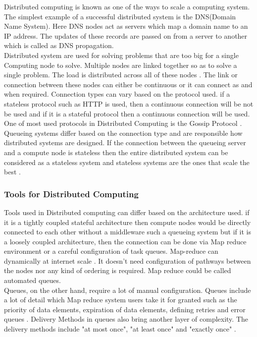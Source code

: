 \documentclass[12pt,a4paper]{article}
\begin{document}
	 Distributed computing is known as one of the ways to scale a computing system. The simplest example of a successful distributed system is the DNS(Domain Name System). Here DNS nodes act as servers which map a domain name to an IP address. The updates of these records are passed on from a server to another which is called as DNS propagation.\\
	 
	 Distributed system are used for solving problems that are too big for a single Computing node to solve. Multiple nodes are linked together so as to solve a single problem. The load is distributed across all of these nodes \citep{sukumar2007distributed} \citep{peleg2000distributed}. The link or connection between these nodes can either be continuous or it can connect as and when required.
	 Connection types can vary based on the protocol used. if a stateless protocol such as HTTP is used, then a continuous connection will be not be used \citep{berners1996hypertext} and if it is a stateful protocol then a continuous connection will be used. One of most used protocols in Distributed Computing is the Gossip Protocol \citep{kermarrec2007gossiping}. Queueing systems differ based on the connection type and are responsible how distributed systems are designed. If the connection between the queueing server and a compute node is stateless then the entire distributed system can be considered as a stateless system and stateless systems are the ones that scale the best \citep{gorton2003copyright}. 
	  
	  
\subsubsection{Tools for Distributed Computing}

Tools used in Distributed computing can differ based on the architecture used. if it is a tightly coupled stateful architecture then compute nodes would be directly connected to each other without a middleware such a queueing system but if it is a loosely coupled architecture, then the connection can be done via Map reduce environment or a careful configuration of task queues. Map-reduce can dynamically at internet scale \citep{costa2013internet}. It doesn't need configuration of pathways between the nodes nor any kind of ordering is required. Map reduce could be called automated queues.\\

Queues, on the other hand, require a lot of manual configuration. Queues include a lot of detail which Map reduce system users take it for granted such as the priority of data elements, expiration of data elements, defining retries and error queues \citep{mckenzie1994cranium}. Delivery Methods in queues also bring another layer of complexity. The delivery methods include "at most once", "at least once" and "exactly once" \citep{toshniwal2014storm}.
\end{document}
